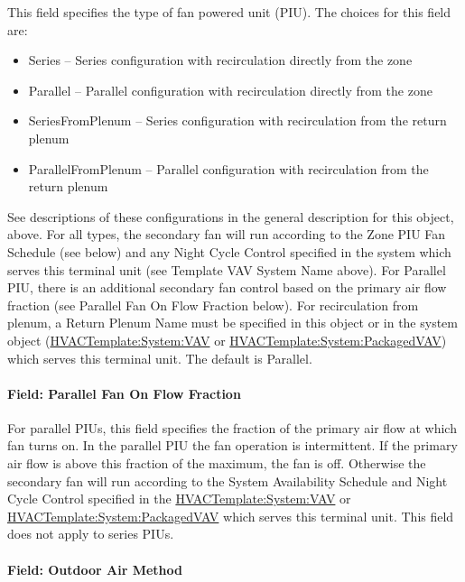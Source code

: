 This field specifies the type of fan powered unit (PIU). The choices for this field are:

\begin{itemize}
\item
  Series -- Series configuration with recirculation directly from the zone
\item
  Parallel -- Parallel configuration with recirculation directly from the zone
\item
  SeriesFromPlenum -- Series configuration with recirculation from the return plenum
\item
  ParallelFromPlenum -- Parallel configuration with recirculation from the return plenum
\end{itemize}

See descriptions of these configurations in the general description for this object, above. For all types, the secondary fan will run according to the Zone PIU Fan Schedule (see below) and any Night Cycle Control specified in the system which serves this terminal unit (see Template VAV System Name above). For Parallel PIU, there is an additional secondary fan control based on the primary air flow fraction (see Parallel Fan On Flow Fraction below). For recirculation from plenum, a Return Plenum Name must be specified in this object or in the system object (\hyperref[hvactemplatesystemvav]{HVACTemplate:System:VAV} or \hyperref[hvactemplatesystempackagedvav]{HVACTemplate:System:PackagedVAV}) which serves this terminal unit. The default is Parallel.

\paragraph{Field: Parallel Fan On Flow Fraction}\label{field-parallel-fan-on-flow-fraction}

For parallel PIUs, this field specifies the fraction of the primary air flow at which fan turns on. In the parallel PIU the fan operation is intermittent. If the primary air flow is above this fraction of the maximum, the fan is off. Otherwise the secondary fan will run according to the System Availability Schedule and Night Cycle Control specified in the \hyperref[hvactemplatesystemvav]{HVACTemplate:System:VAV} or \hyperref[hvactemplatesystempackagedvav]{HVACTemplate:System:PackagedVAV} which serves this terminal unit. This field does not apply to series PIUs.

\paragraph{Field: Outdoor Air Method}\label{field-outdoor-air-method-9}

